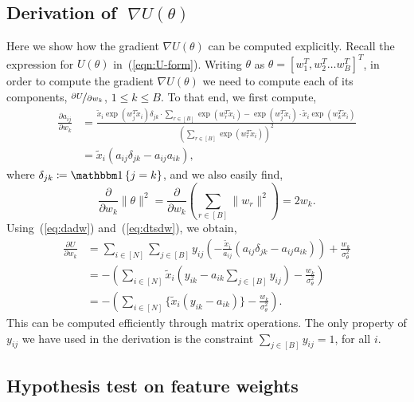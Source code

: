 \subsection{Derivation of {\boldmath $\;\nabla U(\theta)$}}
\label{appdx:gradu}
Here we show how the gradient 
$\nabla U(\theta)$ can be computed explicitly.
Recall the expression for $U(\theta)$ in~(\ref{eqn:U-form}).
Writing $\theta$ as
$\theta = \left[w_1^T, w_2^T \dots w_B^T  \right]^T$,
in order to compute the gradient
$\nabla U(\theta)$ we need to compute
each of its components,
$\nicefrac{\partial U}{\partial w_k}$,
$1\leq k\leq B$.
To that end, we first compute,
%
\begin{align}
	\frac{\partial a_{ij}}{\partial w_k} &= \frac
	{\tilde{x}_i \exp(w_j^T \tilde{x}_i) \delta_{jk} \cdot \sum_{r \in [B]} \exp(w_r^T \tilde{x}_i) 
		- 
		\exp(w_j^T \tilde{x}_i) \cdot \tilde{x}_i \exp(w_k^T \tilde{x}_i)}
	{\left( \sum_{r \in [B]} \exp(w_r^T \tilde{x}_i) \right)^2} \nonumber \\
	&= \tilde{x}_i \left( a_{ij} \delta_{jk} - a_{ij}a_{ik} \right), 
	\label{eq:dadw}
\end{align}
%
where $\delta_{jk} \coloneqq \one \left\{ j = k \right\}$,
and we also easily find,
%
\begin{equation}
	\frac{ \partial}{\partial w_k} \|\theta\|^2 = \frac{\partial}{\partial w_k} \left( \sum_{r \in [B]} \|w_r\|^2 \right) = 2w_k.
	\label{eq:dtsdw}
\end{equation}
%
Using~(\ref{eq:dadw}) and~(\ref{eq:dtsdw}), we obtain,
\begin{align}
	\frac{\partial U}{\partial w_k} &= 
	\sum_{i \in [N]} \sum_{j \in [B]} y_{ij} 
	\left( -\frac{\tilde{x}_i}{a_{ij}} \left( a_{ij} \delta_{jk} - a_{ij} a_{ik} \right) \right)
	+ \frac{w_k}{\sigma_\theta^2} \nonumber \\
	&=  - \left( \sum_{i \in [N]} \tilde{x}_i \left( y_{ik} - a_{ik} \sum_{j \in [B]} y_{ij} \right)
	- \frac{w_k}{\sigma_\theta^2} \right) \nonumber \\
	&= - \left( \sum_{i \in [N]} \Big\{ \tilde{x}_i (y_{ik} - a_{ik}) \Big\} - \frac{w_k}{\sigma_\theta^2} \right).
\end{align}
%
This can be computed 
efficiently through matrix operations. The only property of $y_{ij}$ 
we have used in the derivation is the constraint $\sum_{j \in [B]} y_{ij} = 1$,
for all $i$.

\subsection{Hypothesis test on feature weights}
\label{appdx:hyp-test}

